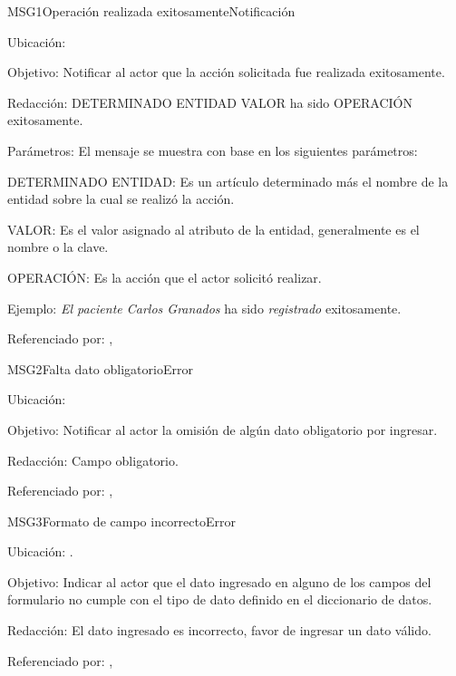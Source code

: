 \begin{mensaje}{MSG1}{Operación realizada exitosamente}{Notificación}
    \item[Ubicación:] \msjSuperior
    \item[Objetivo:] Notificar al actor que la acción solicitada fue realizada exitosamente.
    \item[Redacción:] DETERMINADO ENTIDAD VALOR ha sido OPERACIÓN exitosamente.
    \item[Parámetros:] El mensaje se muestra con base en los siguientes parámetros:
    \begin{Citemize}
	\item DETERMINADO ENTIDAD: Es un artículo determinado más el nombre de la entidad sobre la cual se realizó la acción.
	\item VALOR: Es el valor asignado al atributo de la entidad, generalmente es el nombre o la clave.
	\item OPERACIÓN: Es la acción que el actor solicitó realizar.
    \end{Citemize}
    \item[Ejemplo:] {\em El paciente Carlos Granados} ha sido {\em registrado} exitosamente.
    \item[Referenciado por:] , 
\end{mensaje}

\begin{mensaje}{MSG2}{Falta dato obligatorio}{Error}
	\item[Ubicación:] \msjCampo
	\item[Objetivo:] Notificar al actor la omisión de algún dato obligatorio por ingresar.
	\item[Redacción:] Campo obligatorio.
	\item[Referenciado por:] , 
\end{mensaje}

\begin{mensaje}{MSG3}{Formato de campo incorrecto}{Error}
	\item[Ubicación:] \msjCampo.
	\item[Objetivo:] Indicar al actor que el dato ingresado en alguno de los campos del formulario no cumple con el tipo de dato definido en el diccionario de datos.
	\item[Redacción:] El dato ingresado es incorrecto, favor de ingresar un dato válido.
	\item[Referenciado por:] , 
\end{mensaje}


